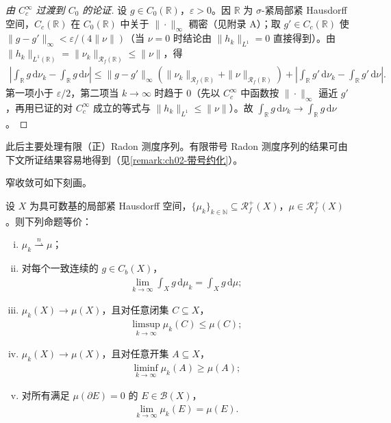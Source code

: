 \documentclass[../../main.tex]{subfiles}%
\begin{document}
\begin{proof}[由 $C_c^\infty$ 过渡到 $C_0$ 的论证]
设 $g\in C_0(\mathbb{R})$，$\varepsilon>0$。因 $\mathbb{R}$ 为 $\sigma$-紧局部紧 Hausdorff 空间，$C_c(\mathbb{R})$ 在 $C_0(\mathbb{R})$ 中关于 $\|\cdot\|_\infty$ 稠密（见附录 A）；取 $g'\in C_c(\mathbb{R})$ 使 $\|g-g'\|_\infty<\varepsilon/(4\|\nu\|)$（当 $\nu=0$ 时结论由 $\|h_k\|_{L^1}=0$ 直接得到）。由 $\|h_k\|_{L^1(\mathbb{R})}=\|\nu_k\|_{\mathscr{R}_f(\mathbb{R})}\leqslant\|\nu\|$，得
\begin{align*}
\left|\int_\mathbb{R}g\,\mathrm{d}\nu_k-\int_\mathbb{R}g\,\mathrm{d}\nu\right|
\leqslant\|g-g'\|_\infty\left(\|\nu_k\|_{\mathscr{R}_f(\mathbb{R})}+\|\nu\|_{\mathscr{R}_f(\mathbb{R})}\right)
+\left|\int_\mathbb{R}g'\,\mathrm{d}\nu_k-\int_\mathbb{R}g'\,\mathrm{d}\nu\right|.
\end{align*}
第一项小于 $\varepsilon/2$，第二项当 $k\to\infty$ 时趋于 $0$（先以 $C_c^\infty$ 中函数按 $\|\cdot\|_\infty$ 逼近 $g'$，再用已证的对 $C_c^\infty$ 成立的等式与 $\|h_k\|_{L^1}\leqslant\|\nu\|$）。故 $\int_\mathbb{R}g\,\mathrm{d}\nu_k\to\int_\mathbb{R}g\,\mathrm{d}\nu$。
\end{proof}

此后主要处理有限（正）Radon 测度序列。有限带号 Radon 测度序列的结果可由下文所证结果容易地得到（见\cref{remark:ch02-带号约化}）。

窄收敛可如下刻画。

\begin{theorem}[Portmanteau 定理]\label{theorem:ch05-portmanteau}
设 $X$ 为具可数基的局部紧 Hausdorff 空间，$\{\mu_k\}_{k\in\mathbb{N}}\subseteq\mathscr{R}^+_f(X)$，$\mu\in\mathscr{R}^+_f(X)$。则下列命题等价：
\begin{enumerate}[(i)]
\item\label{item:ch05-port-i} $\mu_k\stackrel{n}{\rightharpoonup}\mu$；
\item\label{item:ch05-port-ii} 对每个一致连续的 $g\in C_b(X)$，
\begin{align}
\lim_{k\to\infty}\int_X g\,\mathrm{d}\mu_k=\int_X g\,\mathrm{d}\mu;\label{align:ch05-5.6}
\end{align}
\item\label{item:ch05-port-iii} $\mu_k(X)\to\mu(X)$，且对任意闭集 $C\subseteq X$，
\begin{align}
\limsup_{k\to\infty}\mu_k(C)\leqslant\mu(C);\label{align:ch05-5.7}
\end{align}
\item\label{item:ch05-port-iv} $\mu_k(X)\to\mu(X)$，且对任意开集 $A\subseteq X$，
\begin{align}
\liminf_{k\to\infty}\mu_k(A)\geqslant\mu(A);\label{align:ch05-5.8}
\end{align}
\item\label{item:ch05-port-v} 对所有满足 $\mu(\partial E)=0$ 的 $E\in\mathscr{B}(X)$，
\begin{align}
\lim_{k\to\infty}\mu_k(E)=\mu(E).\label{align:ch05-5.9}
\end{align}
\end{enumerate}
\end{theorem}
\end{document}
